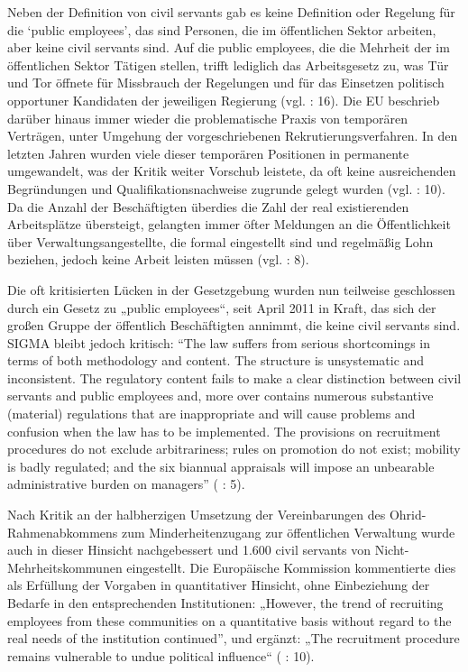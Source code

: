 Neben der Definition von civil servants gab es keine Definition oder Regelung für die ‘public employees’, das sind Personen, die im öffentlichen Sektor arbeiten, aber keine civil servants sind. Auf die public employees, die die Mehrheit der im öffentlichen Sektor Tätigen stellen, trifft lediglich das Arbeitsgesetz zu, was Tür und Tor öffnete für Missbrauch der Regelungen und für das Einsetzen politisch opportuner Kandidaten der jeweiligen Regierung (vgl. \cite{analyt07} : 16). Die EU beschrieb darüber hinaus immer wieder die problematische Praxis von temporären Verträgen, unter Umgehung der vorgeschriebenen Rekrutierungsverfahren. In den letzten Jahren wurden viele dieser temporären Positionen in permanente umgewandelt, was der Kritik weiter Vorschub leistete, da oft keine ausreichenden Begründungen und Qualifikationsnachweise zugrunde gelegt wurden (vgl. \cite{eurcom11b} : 10). Da die Anzahl der Beschäftigten überdies die Zahl der real existierenden Arbeitsplätze übersteigt, gelangten immer öfter Meldungen an die Öffentlichkeit über Verwaltungsangestellte, die formal eingestellt sind und regelmäßig Lohn beziehen, jedoch keine Arbeit leisten müssen (vgl. \cite{malahova} : 8).\par
Die oft kritisierten Lücken in der Gesetzgebung wurden nun teilweise geschlossen durch ein Gesetz zu „public employees“, seit April 2011 in Kraft, das sich der großen Gruppe der öffentlich Beschäftigten annimmt, die keine civil servants sind. SIGMA bleibt jedoch kritisch: “The law suffers from serious shortcomings in terms of both methodology and content. The structure is unsystematic and inconsistent. The regulatory content fails to make a clear distinction between civil servants and public employees and, more over contains numerous substantive (material) regulations that are inappropriate and will cause problems and confusion when the law has to be implemented. The provisions on recruitment procedures do not exclude arbitrariness; rules on promotion do not exist; mobility is badly regulated; and the six biannual appraisals will impose an unbearable administrative burden on managers” (\cite{oecd10c} : 5).\par
Nach Kritik an der halbherzigen Umsetzung der Vereinbarungen des Ohrid-Rahmenabkommens zum Minderheitenzugang zur öffentlichen Verwaltung wurde auch in dieser Hinsicht nachgebessert und 1.600 civil servants von Nicht-Mehrheitskommunen eingestellt. Die Europäische Kommission kommentierte dies als Erfüllung der Vorgaben in quantitativer Hinsicht, ohne Einbeziehung der Bedarfe in den entsprechenden Institutionen: „However, the trend of recruiting employees from these communities on a quantitative basis without regard to the real needs of the institution continued”, und ergänzt: „The recruitment procedure remains vulnerable to undue political influence“ (\cite{eurcom11b} : 10).\par
